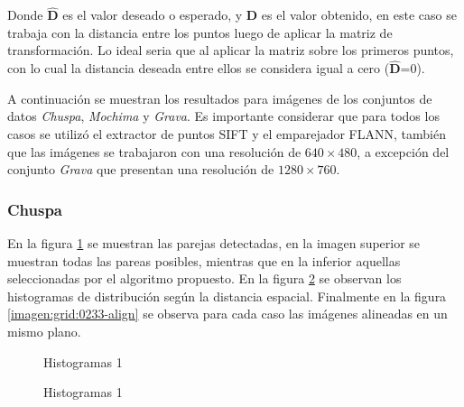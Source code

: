 Donde $\hat{\mathbf{D}}$ es el valor deseado o esperado, y $\mathbf{D}$ es el valor obtenido, en este caso se trabaja con la distancia entre los puntos luego de aplicar la matriz de transformación. Lo ideal seria que al aplicar la matriz sobre los primeros puntos, con lo cual la distancia deseada entre ellos se considera igual a cero ($\hat{\mathbf{D}}$=0).

A continuación se muestran los resultados para imágenes de los conjuntos de datos \textit{Chuspa}, \textit{Mochima} y \textit{Grava}. Es importante considerar que para todos los casos se utilizó el extractor de puntos SIFT y el emparejador FLANN, también que las imágenes se trabajaron con una resolución de $640 \times 480$, a excepción del conjunto \textit{Grava} que presentan una resolución de $1280 \times 760$.

\subsubsection*{Chuspa}

En la figura \ref{imagen:grid:0233-match} se muestran las parejas detectadas, en la imagen superior se muestran todas las pareas posibles, mientras que en la inferior aquellas seleccionadas por el algoritmo propuesto. En la figura \ref{imagen:grid:0233-hist} se observan los histogramas de distribución según la distancia espacial. Finalmente en la figura \ref{imagen:grid:0233-align} se observa para cada caso las imágenes alineadas en un mismo plano.

\begin{figure}[h]
	\centering     %
	\hspace{1mm}%
	
	\caption[Histogramas 1]{Histogramas 1}
	\label{imagen:grid:0233-match}
\end{figure}

\begin{figure}[h]
	\centering     %
	\hspace{3mm}%
	
	\caption[Histogramas 1]{Histogramas 1}
	\label{imagen:grid:0233-hist}
\end{figure}

